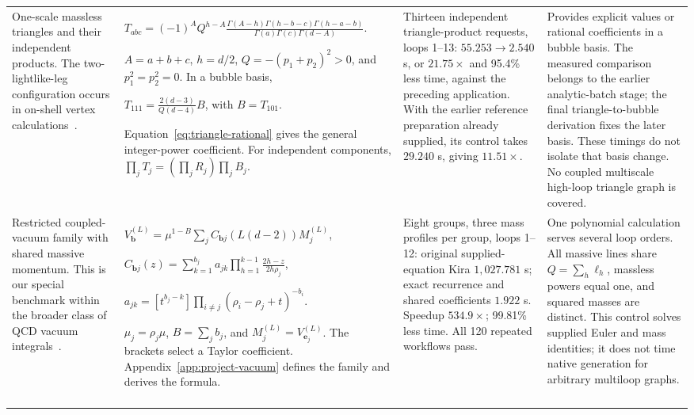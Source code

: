 \begin{landscape}
\begin{longtable}{@{}>{\raggedright\arraybackslash}p{3.9cm}>{\raggedright\arraybackslash}p{8.0cm}>{\raggedright\arraybackslash}p{5.1cm}>{\raggedright\arraybackslash}p{6.2cm}@{}}
One-scale massless triangles and their independent products. The two-lightlike-leg configuration occurs in on-shell vertex calculations~\cite{DavydychevOsland1998}.
& $\displaystyle T_{abc}=(-1)^A Q^{h-A}\frac{\Gamma(A-h)\Gamma(h-b-c)\Gamma(h-a-b)}{\Gamma(a)\Gamma(c)\Gamma(d-A)}$.
\par $A=a+b+c$, $h=d/2$, $Q=-(p_1+p_2)^2>0$, and $p_1^2=p_2^2=0$. In a bubble basis,
\par $\displaystyle T_{111}=\frac{2(d-3)}{Q(d-4)}B$, with $B=T_{101}$.
\par Equation~\eqref{eq:triangle-rational} gives the general integer-power coefficient. For independent components, $\prod_jT_j=(\prod_jR_j)\prod_jB_j$.
& Thirteen independent triangle-product requests, loops 1--13: $55.253\to2.540$ s, or $21.75\times$ and 95.4\% less time, against the preceding application. With the earlier reference preparation already supplied, its control takes $29.240$ s, giving $11.51\times$.
& Provides explicit values or rational coefficients in a bubble basis. The measured comparison belongs to the earlier analytic-batch stage; the final triangle-to-bubble derivation fixes the later basis. These timings do not isolate that basis change. No coupled multiscale high-loop triangle graph is covered.\\\addlinespace[7pt]

Restricted coupled-vacuum family with shared massive momentum. This is our special benchmark within the broader class of QCD vacuum integrals~\cite{SchroderSteinhauser2006}.
& $\displaystyle V_{\boldsymbol b}^{(L)}=\mu^{1-B}\sum_jC_{\boldsymbol b j}(L(d-2))M_j^{(L)}$,
\par $\displaystyle C_{\boldsymbol b j}(z)=\sum_{k=1}^{b_j}a_{jk}\prod_{h=1}^{k-1}\frac{2h-z}{2h\rho_j}$,
\par $\displaystyle a_{jk}=[t^{b_j-k}]\prod_{i\ne j}(\rho_i-\rho_j+t)^{-b_i}$.
\par $\mu_j=\rho_j\mu$, $B=\sum_jb_j$, and $M_j^{(L)}=V_{\boldsymbol e_j}^{(L)}$. The brackets select a Taylor coefficient. Appendix~\ref{app:project-vacuum} defines the family and derives the formula.
& Eight groups, three mass profiles per group, loops 1--12: original supplied-equation Kira $1,027.781$ s; exact recurrence and shared coefficients $1.922$ s. Speedup $534.9\times$; 99.81\% less time. All 120 repeated workflows pass.
& One polynomial calculation serves several loop orders. All massive lines share $Q=\sum_h\ell_h$, massless powers equal one, and squared masses are distinct. This control solves supplied Euler and mass identities; it does not time native generation for arbitrary multiloop graphs.\\\addlinespace[7pt]


\end{longtable}
\end{landscape}
